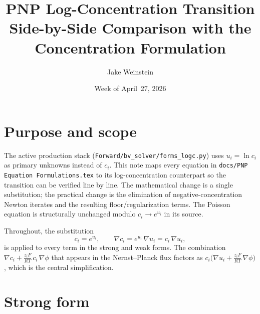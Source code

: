 \documentclass[11pt]{article}
\title{PNP Log-Concentration Transition\\
       \large Side-by-Side Comparison with the Concentration Formulation}
\author{Jake Weinstein}
\date{Week of April~27, 2026}
\begin{document}
\maketitle

\section{Purpose and scope}
The active production stack
(\verb|Forward/bv_solver/forms_logc.py|) uses
$u_i = \ln c_i$ as primary unknowns instead of $c_i$. This note maps every
equation in \texttt{docs/PNP Equation Formulations.tex} to its
log-concentration counterpart so the transition can be verified line by line.
The mathematical change is a single substitution; the practical change is the
elimination of negative-concentration Newton iterates and the resulting
floor/regularization terms. The Poisson equation is structurally unchanged
modulo $c_i \to e^{u_i}$ in its source.

Throughout, the substitution
\[
  c_i = e^{u_i},
  \qquad
  \nabla c_i = e^{u_i}\,\nabla u_i = c_i\,\nabla u_i,
\]
is applied to every term in the strong and weak forms. The combination
$\nabla c_i + \tfrac{z_i F}{RT}\,c_i\,\nabla\phi$ that appears in the
Nernst--Planck flux factors as $c_i \bigl(\nabla u_i + \tfrac{z_i
F}{RT}\,\nabla\phi\bigr)$, which is the central simplification.

\section{Strong form}
\end{document}
